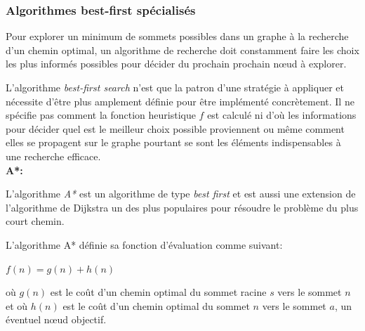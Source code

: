 
\subsubsection{Algorithmes best-first spécialisés}
Pour explorer un minimum de sommets possibles dans un graphe à la recherche d'un chemin optimal, un algorithme de recherche doit constamment faire les choix les plus informés possibles pour décider du prochain prochain nœud à explorer.

L'algorithme \textit{best-first search} n'est que la patron d'une stratégie à appliquer et nécessite d'être plus amplement définie pour être implémenté concrètement.
Il ne spécifie pas comment la fonction heuristique $f$ est calculé ni d'où les informations pour décider quel est le meilleur choix possible proviennent ou même comment elles se propagent sur le graphe pourtant se sont les éléments indispensables à une recherche efficace. \\

{\setlength{\parindent}{0cm}\textbf{A*:}}

L'algorithme \textit{A*} est un algorithme de type \textit{best first} et est aussi une extension de l'algorithme de Dijkstra\cite{dijkstra} un des plus populaires pour résoudre le problème du plus court chemin. 

L'algorithme A* définie\cite{description-a*} sa fonction d'évaluation comme suivant: 

\begin{center}
    $f(n) = g(n) + h(n)$
\end{center}

où $g(n)$ est le coût d'un chemin optimal du sommet racine $s$ vers le sommet $n$ et où $h(n)$ est le coût d'un chemin optimal du sommet $n$ vers le sommet $a$, un éventuel nœud objectif.\\    


